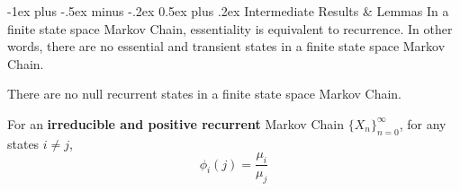 \documentclass[10pt,landscape,letterpaper]{article}
\makeatletter
\renewcommand{\section}{\@startsection{section}{1}{0mm}%
                                {-1ex plus -.5ex minus -.2ex}%
                                {0.5ex plus .2ex}%
                                {\sffamily\large}}
\makeatother
\begin{document}
\begin{multicols}{3}
\section{Intermediate Results \& Lemmas}
 In a finite state space Markov Chain, essentiality is equivalent to recurrence. In other words, there are no essential and transient states in a finite state space Markov Chain.

\smallskip

 There are no null recurrent states in a finite state space Markov Chain.

\smallskip

 For an \textbf{irreducible and positive recurrent} Markov Chain $\{ X_n \}_{n=0}^{\infty}$, for any states $i \neq j$,
\[
\phi_{i}(j) = \frac{\mu_i}{\mu_j}
\]

\end{multicols}
\end{document}
